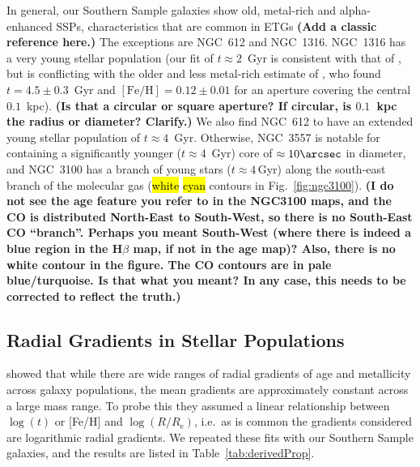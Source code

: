 \documentclass[a4paper,fleqn,usenatbib]{mnras}
\DeclareRobustCommand{\removed}[1]{{\sethlcolor{red}\hl{#1}}}
\DeclareRobustCommand{\added}[1]{{\sethlcolor{green}\hl{#1}}}
\begin{document}
In general, our Southern Sample galaxies show old, metal-rich and
alpha-enhanced SSPs, characteristics that are common in ETGs {\bf (Add
  a classic reference here.)} The exceptions are NGC~612 and
NGC~1316. NGC~1316 has a very young stellar population (our fit of
$t\approx2$~Gyr is consistent with that of \citealt{Kuntschner2000},
but is conflicting with the older and less metal-rich estimate of
\citealt{Koleva2011}, who found $t=4.5\pm0.3$~Gyr and
$\mathrm{[Fe/H]}=0.12\pm0.01$ for an aperture covering the central
$0.1$~kpc). {\bf (Is that a circular or square aperture? If circular,
  is $0.1$~kpc the radius or diameter? Clarify.)} We also find NGC~612
to have an extended young stellar population of
$t\approx4$~Gyr. Otherwise, NGC~3557 is notable for containing a
significantly younger ($t\approx4$~Gyr) core of $\approx10\arcsec$ in
diameter, and NGC~3100 has a branch of young stars ($t\approx4$\,Gyr)
along the south-east branch of the molecular gas (\removed{white} 
\added{cyan} contours in
Fig.~\ref{fig:ngc3100}). {\bf (I do not see the age feature you refer
  to in the NGC3100 maps, and the CO is distributed North-East to
  South-West, so there is no South-East CO ``branch''. Perhaps you
  meant South-West (where there is indeed a blue region in the
  H$\beta$ map, if not in the age map)? Also, there is no white
  contour in the figure. The CO contours are in pale
  blue/turquoise. Is that what you meant? In any case, this needs to
  be corrected to reflect the truth.)}

\subsection{Radial Gradients in Stellar Populations}
\label{subsec:popGrad}

\citet{Koleva2011} showed that while there are wide ranges of radial
gradients of age and metallicity across galaxy populations, the mean
gradients are approximately constant across a large mass range. To
probe this they assumed a linear relationship between $\log(t)$ or
[Fe/H] and $\log(R/R_\text{e})$, i.e.\ as is common the gradients
considered are logarithmic radial gradients. We repeated these fits
with our Southern Sample galaxies, and the results are listed in
Table~\ref{tab:derivedProp}.
\end{document}
